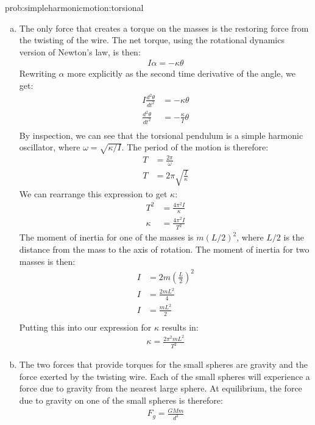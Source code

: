 \begin{solution}{prob:simpleharmonicmotion:torsional}\label{soln:simpleharmonicmotion:torsional}
\begin{enumerate}[(a)]
\item The only force that creates a torque on the masses is the restoring force from the twisting of the wire. The net torque, using the rotational dynamics version of Newton's law, is then:
\begin{align*}
I\alpha=-\kappa\theta
\end{align*}
Rewriting $\alpha$ more explicitly as the second time derivative of the angle, we get:
\begin{align*}
I\frac{d^2\theta}{dt^2}&=-\kappa\theta\\
\frac{d^2\theta}{dt^2}&=-\frac{\kappa}{I}\theta\\
\end{align*}
By inspection, we can see that the torsional pendulum is a simple harmonic oscillator, where $\omega=\sqrt{\kappa/I}$. The period of the motion is therefore:
\begin{align*}
T&=\frac{2\pi}{\omega}\\
T&=2\pi\sqrt{\frac{I}{\kappa}}
\end{align*}
We can rearrange this expression to get $\kappa$:
\begin{align*}
T^2&=\frac{4\pi^2I}{\kappa}\\
\kappa&=\frac{4\pi^2I}{T^2}
\end{align*}
The moment of inertia for one of the masses is $m(L/2)^2$, where $L/2$ is the distance from the mass to the axis of rotation. The moment of inertia for two masses is then:
\begin{align*}
I&=2m(\frac{L}{2})^2\\
I&=\frac{2mL^2}{4}\\
I&=\frac{mL^2}{2}\\
\end{align*}
Putting this into our expression for $\kappa$ results in:
\begin{align*}
\kappa=\frac{2\pi^2mL^2}{T^2}
\end{align*}
\item The two forces that provide torques for the small spheres are gravity and the force exerted by the twisting wire. Each of the small spheres will experience a force due to gravity from the nearest large sphere. At equilibrium, the force due to gravity on one of the small spheres is therefore:
\begin{align*}
F_g=\frac{GMm}{d^2}

\end{align*}
\end{enumerate}
\end{solution}
